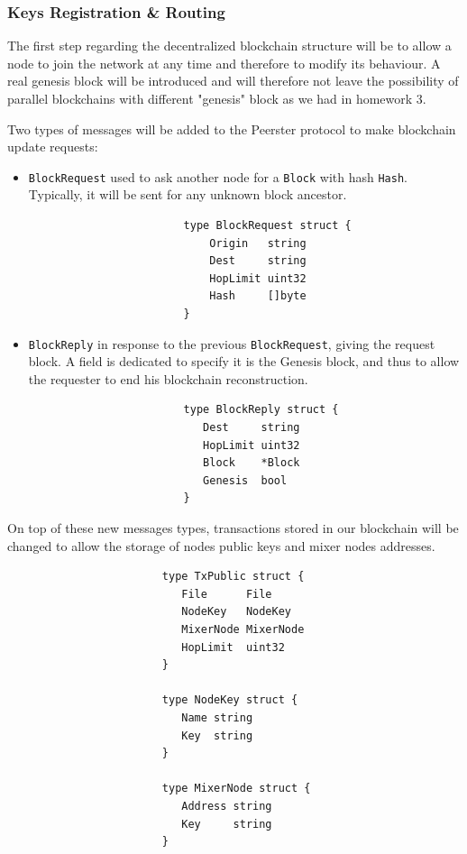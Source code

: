 \documentclass[11pt, a4paper]{article}
\begin{document}
        \subsubsection{Keys Registration \& Routing}

           The first step regarding the decentralized blockchain structure will be to allow a node to join the network at any time and therefore to modify its behaviour.
           A real genesis block will be introduced and will therefore not leave the possibility of parallel blockchains with different "genesis" block as we had in homework 3.

           Two types of messages will be added to the Peerster protocol to make blockchain update requests:
           \begin{itemize}
                \item \texttt{BlockRequest} used to ask another node for a \texttt{Block} with hash \texttt{Hash}. Typically, it will be sent for any unknown block ancestor.
                    \begin{lstlisting}
                        type BlockRequest struct {
                            Origin   string
                            Dest     string
                            HopLimit uint32
                            Hash     []byte
                        }
                    \end{lstlisting}

               \item \texttt{BlockReply} in response to the previous \texttt{BlockRequest}, giving the request block.
               A field is dedicated to specify it is the Genesis block, and thus to allow the requester to end his blockchain reconstruction.
                    \begin{lstlisting}
                        type BlockReply struct {
                           Dest     string
                           HopLimit uint32
                           Block    *Block
                           Genesis  bool
                        }
                    \end{lstlisting}
           \end{itemize}

            On top of these new messages types, transactions stored in our blockchain will be changed to allow the storage of nodes public keys and mixer nodes addresses.
                \begin{lstlisting}
                        type TxPublic struct {
                           File      File
                           NodeKey   NodeKey
                           MixerNode MixerNode
                           HopLimit  uint32
                        }

                        type NodeKey struct {
                           Name string
                           Key  string
                        }

                        type MixerNode struct {
                           Address string
                           Key     string
                        }
                \end{lstlisting}
\end{document}
